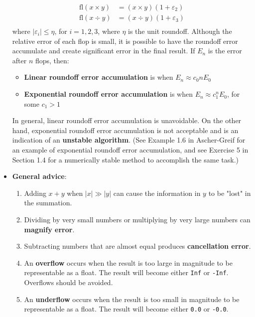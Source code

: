 \documentclass{report}
\begin{document}
\begin{itemize}
\begin{align*}
                    \mathrm{fl}(x \times y) &= (x \times y)(1 + \varepsilon_2) \\
                    \mathrm{fl}(x \div y) &= (x \div y)(1 + \varepsilon_3) \\
                \end{align*}
                where \( |\varepsilon_i| \leq \eta \), for \( i = 1,2,3 \), where \( \eta \) is the unit roundoff.
                \bigbreak \noindent 
                Although the relative error of each flop is small, it is possible to have the roundoff error accumulate and create significant error in the final result. If \( E_n \) is the error after \( n \) flops, then:
                \begin{itemize}
                    \item \textbf{Linear roundoff error accumulation} is when \( E_n \approx c_0 n E_0 \)
                    \item \textbf{Exponential roundoff error accumulation} is when \( E_n \approx c_1^n E_0 \), for some \( c_1 > 1 \)
                \end{itemize}
                In general, linear roundoff error accumulation is unavoidable. On the other hand, exponential roundoff error accumulation is not acceptable and is an indication of an \textbf{unstable algorithm}. (See Example 1.6 in Ascher-Greif for an example of exponential roundoff error accumulation, and see Exercise 5 in Section 1.4 for a numerically stable method to accomplish the same task.)
            \item \textbf{General advice}: 
                \begin{enumerate}
                    \item Adding \( x + y \) when \( |x| \gg |y| \) can cause the information in \( y \) to be "lost" in the summation.
                    \item Dividing by very small numbers or multiplying by very large numbers can \textbf{magnify error}.
                    \item Subtracting numbers that are almost equal produces \textbf{cancellation error}.
                    \item An \textbf{overflow} occurs when the result is too large in magnitude to be representable as a float. The result will become either \texttt{Inf} or \texttt{-Inf}. Overflows should be avoided.
                    \item An \textbf{underflow} occurs when the result is too small in magnitude to be representable as a float. The result will become either \texttt{0.0} or \texttt{-0.0}.

\end{enumerate}
\end{itemize}
\end{document}
